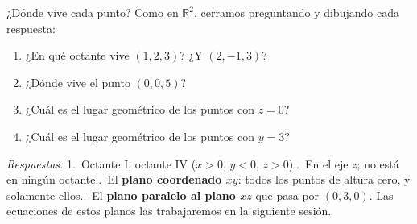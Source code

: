 \documentclass[aspectratio=169,10pt]{beamer}
\newcommand{\destaca}[1]{%
  \par\vspace{3pt}\noindent
  \colorbox{turquesaClaro}{%
    \parbox{\dimexpr\linewidth-2\fboxsep\relax}{\vspace{3pt}#1\vspace{3pt}}}%
  \par\vspace{3pt}}
\begin{document}
\begin{frame}{¿Dónde vive cada punto?}
  Como en $\mathbb{R}^2$, cerramos preguntando y dibujando cada
  respuesta:

  \vspace{0.2cm}
  \begin{enumerate}
    \item ¿En qué octante vive $(1,2,3)$? ¿Y $(2,-1,3)$?
    \item ¿Dónde vive el punto $(0,0,5)$?
    \item ¿Cuál es el lugar geométrico de los puntos con $z=0$?
    \item ¿Cuál es el lugar geométrico de los puntos con $y=3$?
  \end{enumerate}

  \vspace{0.4cm}
  \destaca{\small \textit{Respuestas.} 1.~Octante I; octante IV
  ($x>0$, $y<0$, $z>0$).\quad 2.~En el eje $z$; no está en ningún
  octante.\quad 3.~El \textbf{plano coordenado $xy$}: todos los puntos
  de altura cero, y solamente ellos.\quad 4.~El \textbf{plano paralelo
  al plano $xz$} que pasa por $(0,3,0)$. Las ecuaciones de estos
  planos las trabajaremos en la siguiente sesión.}
\end{frame}
\end{document}

